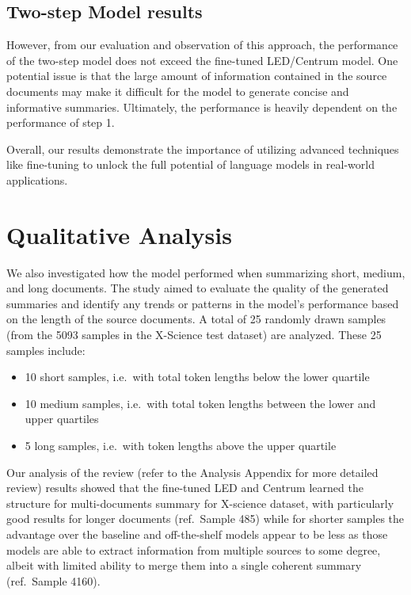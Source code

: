 \documentclass[12pt, twocolumn]{article}
\numberwithin{equation}{section}
\begin{document}
\subsection{Two-step Model results}
\label{app:model-two-step-model-results}

However, from our evaluation and observation of this approach, the performance of the two-step model does not exceed the fine-tuned LED/Centrum model. One potential issue is that the large amount of information contained in the source documents may make it difficult for the model to generate concise and informative summaries. Ultimately, the performance is heavily dependent on the performance of step 1. 

Overall, our results demonstrate the importance of utilizing advanced techniques like fine-tuning to unlock the full potential of language models in real-world applications.

\section{Qualitative Analysis}
\label{app:qualitative}

We also investigated how the model performed when summarizing short, medium, and long documents. The study aimed to evaluate the quality of the generated summaries and identify any trends or patterns in the model's performance based on the length of the source documents. A total of 25 randomly drawn samples (from the 5093 samples in the X-Science test dataset) are analyzed.  These 25 samples include:

\begin{itemize}
    \item 10 short samples, i.e.~with total token lengths below the lower quartile
    \item 10 medium samples, i.e.~with total token lengths between the lower and upper quartiles
    \item 5 long samples, i.e.~with token lengths above the upper quartile
\end{itemize}

Our analysis of the review (refer to the Analysis Appendix for more detailed review) results showed that the fine-tuned LED and Centrum learned the structure for multi-documents summary for X-science dataset, with particularly good results for longer documents (ref.~Sample 485) while for shorter samples the advantage over the baseline and off-the-shelf models appear to be less as those models are able to extract information from multiple sources to some degree, albeit with limited ability to merge them into a single coherent summary (ref.~Sample 4160). 
\end{document}
